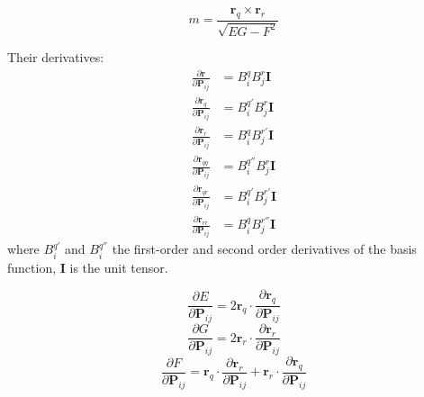 \documentclass[journal]{IEEEtran}
\theoremstyle{definition}
\begin{document}
\begin{equation}
  m = \frac{\mathbf{r}_q \times \mathbf{r}_r}{\sqrt{EG-F^2}}
\end{equation}

Their derivatives:
\begin{subequations}
  \begin{align}
    \frac{\partial \mathbf{r}}{\partial \mathbf{P}_{ij}}      & = B_i^{q} B_j^{r} \mathbf{I}   \\
    \frac{\partial \mathbf{r}_{q}}{\partial \mathbf{P}_{ij}}  & = B_i^{q'} B_j^{r} \mathbf{I}  \\
    \frac{\partial \mathbf{r}_{r}}{\partial \mathbf{P}_{ij}}  & = B_i^{q} B_j^{r'} \mathbf{I}  \\
    \frac{\partial \mathbf{r}_{qq}}{\partial \mathbf{P}_{ij}} & = B_i^{q''} B_j^{r} \mathbf{I} \\
    \frac{\partial \mathbf{r}_{qr}}{\partial \mathbf{P}_{ij}} & = B_i^{q'} B_j^{r'} \mathbf{I} \\
    \frac{\partial \mathbf{r}_{rr}}{\partial \mathbf{P}_{ij}} & = B_i^{q} B_j^{r''} \mathbf{I}
  \end{align}
\end{subequations}
where $B_i^{q'}$ and $B_i^{q''}$ the first-order and second order derivatives of the basis function,
$\mathbf{I}$ is the unit tensor.

\begin{equation}
  \frac{\partial E}{\partial \mathbf{P}_{ij}} = 2 \mathbf{r}_{q} \cdot \frac{\partial \mathbf{r}_{q}}{\partial \mathbf{P}_{ij}}
\end{equation}
\begin{equation}
  \frac{\partial G}{\partial \mathbf{P}_{ij}} = 2 \mathbf{r}_{r} \cdot \frac{\partial \mathbf{r}_{r}}{\partial \mathbf{P}_{ij}}
\end{equation}
\begin{equation}
  \frac{\partial F}{\partial \mathbf{P}_{ij}} = \mathbf{r}_{q} \cdot \frac{\partial \mathbf{r}_{r}}{\partial \mathbf{P}_{ij}} + \mathbf{r}_{r} \cdot \frac{\partial \mathbf{r}_{q}}{\partial \mathbf{P}_{ij}}
\end{equation}
\end{document}
